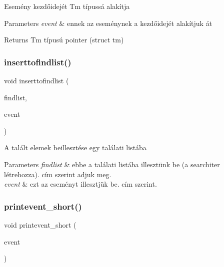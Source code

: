 Esemény kezdőidejét Tm típussá alakítja 
\begin{DoxyParams}{Parameters}
{\em event} & ennek az eseménynek a kezdőidejét alakítjuk át \\
\hline
\end{DoxyParams}
\begin{DoxyReturn}{Returns}
Tm típusú pointer (struct tm) 
\end{DoxyReturn}
\mbox{\label{group__search_gace601ce27f555e73988b2db946d1ca5e}} 
\subsubsection{\texorpdfstring{inserttofindlist()}{inserttofindlist()}}
{\footnotesize\ttfamily void inserttofindlist (\begin{DoxyParamCaption}\item[{\hyperlink{struct_find_list}{Find\+List} $\ast$}]{findlist,  }\item[{\hyperlink{struct_event}{Event} $\ast$}]{event }\end{DoxyParamCaption})}

A talált elemek beillesztése egy találati listába 
\begin{DoxyParams}{Parameters}
{\em findlist} & ebbe a találati listába illesztünk be (a searchiter létrehozza). cím szerint adjuk meg. \\
\hline
{\em event} & ezt az eseményt illesztjük be. cím szerint. \\
\hline
\end{DoxyParams}
\mbox{\label{group__search_ga2561d96be1299fd3f5730c6d82143709}} 
\subsubsection{\texorpdfstring{printevent\+\_\+short()}{printevent\_short()}}
{\footnotesize\ttfamily void printevent\+\_\+short (\begin{DoxyParamCaption}\item[{\hyperlink{struct_event}{Event} $\ast$}]{event }\end{DoxyParamCaption})}

